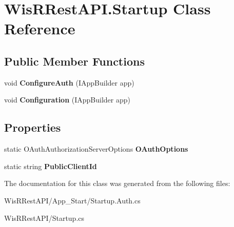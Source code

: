 \hypertarget{class_wis_r_rest_a_p_i_1_1_startup}{}\section{Wis\+R\+Rest\+A\+P\+I.\+Startup Class Reference}
\label{class_wis_r_rest_a_p_i_1_1_startup}
\subsection*{Public Member Functions}
\begin{DoxyCompactItemize}
\item 
\hypertarget{class_wis_r_rest_a_p_i_1_1_startup_ab722ac8ea6788b4105acd1c867fa60ce}{}void {\bfseries Configure\+Auth} (I\+App\+Builder app)\label{class_wis_r_rest_a_p_i_1_1_startup_ab722ac8ea6788b4105acd1c867fa60ce}

\item 
\hypertarget{class_wis_r_rest_a_p_i_1_1_startup_a35af1615d18980950b49701bdd2b1739}{}void {\bfseries Configuration} (I\+App\+Builder app)\label{class_wis_r_rest_a_p_i_1_1_startup_a35af1615d18980950b49701bdd2b1739}

\end{DoxyCompactItemize}
\subsection*{Properties}
\begin{DoxyCompactItemize}
\item 
\hypertarget{class_wis_r_rest_a_p_i_1_1_startup_aed1266e4ffe66ebac53231626b42f1b7}{}static O\+Auth\+Authorization\+Server\+Options {\bfseries O\+Auth\+Options}\label{class_wis_r_rest_a_p_i_1_1_startup_aed1266e4ffe66ebac53231626b42f1b7}

\item 
\hypertarget{class_wis_r_rest_a_p_i_1_1_startup_aae1b1ddc02b887e7da08882afd5ebe87}{}static string {\bfseries Public\+Client\+Id}\label{class_wis_r_rest_a_p_i_1_1_startup_aae1b1ddc02b887e7da08882afd5ebe87}

\end{DoxyCompactItemize}


The documentation for this class was generated from the following files\+:\begin{DoxyCompactItemize}
\item 
Wis\+R\+Rest\+A\+P\+I/\+App\+\_\+\+Start/Startup.\+Auth.\+cs\item 
Wis\+R\+Rest\+A\+P\+I/Startup.\+cs\end{DoxyCompactItemize}
